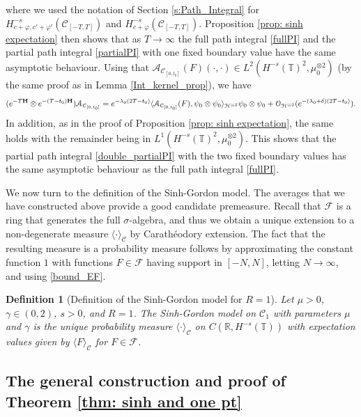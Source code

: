 \documentclass[11pt]{amsart}
\numberwithin{equation}{section}
\newtheorem{definition}[theorem]{Definition}
\theoremstyle{definition}
\newcommand{\R}{\mathbb{R}}
\newcommand{\cjd}{\rangle}
\newcommand{\cjg}{\langle}
\newcommand{\mc}{\mathcal}
\newcommand{\la}{\lambda}
\def\T{\mathbb{T}}
\begin{document}
where we used the notation of Section \ref{s:Path_Integral} for $H^{-s}_{c+\varphi,c'+\varphi'}(\mc{C}_{[-T,T]})$ and 
$H^{-s}_{c+\varphi}(\mc{C}_{[-T,T]})$. Proposition \ref{prop: sinh expectation} then shows that as $T\to \infty$ the full path integral \eqref{fullPI} and the partial path integral \eqref{partialPI} with one fixed boundary value have the same asymptotic behaviour.
Using that $\mc{A}_{\mc{C}_{[0,t_0]}}(F)(\cdot,\cdot)\in L^2(H^{-s}(\T)^2,\mu_0^{\otimes 2})$ (by the same proof as in Lemma \ref{Int_kernel_prop}), we have 
\[(e^{-T{\bf H}}\otimes e^{-(T-t_0){\bf H}})\mc{A}_{\mc{C}_{[0,t_0]}}= e^{-\la_0 (2T-t_0)} \cjg \mc{A}_{\mc{C}_{[0,t_0]}}(F),\psi_0 \otimes \psi_0\cjd_{\mc{H}^{\otimes 2}} \psi_0\otimes \psi_0  +\mc{O}_{\mc{H}^{\otimes 2}}(e^{-(\la_0+\delta) (2T-t_0)} ).\] 
In addition, as in the proof of Proposition \ref{prop: sinh expectation}, the same holds with the remainder being in $L^1(H^{-s}(\T)^2,\mu_0^{\otimes 2})$. This shows that the partial path integral \eqref{double_partialPI} with the two fixed boundary values has the same asymptotic behaviour as the full path integral \eqref{fullPI}.

 
 
 
We now turn to the definition of the Sinh-Gordon model. The averages that we have constructed above provide a good candidate premeasure. Recall that $\mathcal{F}$ is a ring that generates the full $\sigma$-algebra, and thus we obtain a unique extension to a non-degenerate measure $\cjg \cdot \cjd_{\mc{C}}$ by Carath\'eodory extension. The fact that the resulting measure is a probability measure follows by approximating the constant function $1$ with functions $F\in \mc{F}$ having support  in $[-N,N]$, letting $N\to \infty$, and using \eqref{bound_EF}.

\begin{definition}[Definition of the Sinh-Gordon model for $R=1$]
Let $\mu >0$, $\gamma \in (0,2)$, $s>0$, and $R=1$. The Sinh-Gordon model on $\mathcal{C}_{1}$ with parameters $\mu$ and $\gamma$ is the unique probability measure $\langle \cdot \rangle_{\mc{C}}$ on $C(\R,H^{-s}(\T))$ with expectation values given by $\langle F\rangle_{\mc{C}}$  for $F \in \mathcal F$.
\end{definition} 


\subsection{The general construction and proof of Theorem \ref{thm: sinh and one pt}} \label{subsec: construction sinh R}
\end{document}
